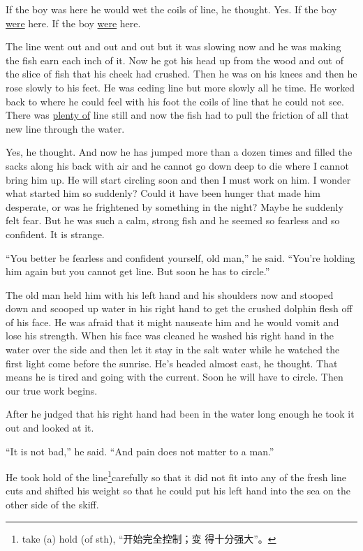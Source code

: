 If the boy was here he would wet the coils of line, he thought. Yes. If the
boy \uline{were} here. If the boy \uline{were} here.

The line went out and out and out but it was slowing now and he was making
the fish earn each inch of it. Now he got his head up from the wood and out
of the slice of fish that his cheek had \gls{crushed}. Then he was on his
knees and then he rose slowly to his feet. He was \gls{ceding} line but more
slowly all he time. He worked back to where he could feel with his foot the
coils of line that he could not see. There was \uline{plenty of} line still and now
the fish had to pull the \gls{friction} of all that new line through the water.

Yes, he thought. And now he has jumped more than a \gls{dozen} times and
filled the sacks along his back with air and he cannot go down deep to die
where I cannot bring him up. He will start circling soon and then I must
work on him. I wonder what started him so suddenly? Could it have been
hunger that made him desperate, or was he \gls{frightened} by something in
the night? Maybe he suddenly felt fear. But he was such a calm, strong fish
and he seemed so \gls{fearless} and so confident. It is strange.

``You better be fearless and confident yourself, old man,'' he said.
``You're holding him again but you cannot get line. But soon he has to
circle.''

The old man held him with his left hand and his shoulders now and stooped
down and \gls{scoop}ed up water in his right hand to get the crushed dolphin
flesh off of his face. He was afraid that it might \gls{nauseate} him and he
would vomit and lose his strength. When his face was cleaned he washed his
right hand in the water over the side and then let it stay in the salt water
while he watched the first light come before the sunrise. He's headed almost
east, he thought. That means he is tired and going with the current. Soon he
will have to circle. Then our true work begins.

After he judged that his right hand had been in the water long enough he
took it out and looked at it.

``It is not bad,'' he said. ``And pain does not matter to a man.''

He took hold of the line\footnote{take (a) hold (of sth), “开始完全控制；变
  得十分强大”。}carefully so that it did not fit into any of the fresh line
cuts and shifted his weight so that he could put his left hand into the sea
on the other side of the skiff.

